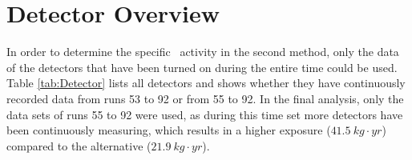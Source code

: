 \appendix


\chapter{Detector Overview}

In order to determine the specific \Kr\ activity in the second method, only the data of the detectors that have been turned on during the entire time could be used.
Table \ref{tab:Detector} lists all detectors and shows whether they have continuously recorded data from runs 53 to 92 or from 55 to 92.
In the final analysis, only the data sets of runs 55 to 92 were used, as during this time set more detectors have been continuously measuring, which results in a higher exposure ($41.5 \ \unit{kg}\cdot\unit{yr}$) compared to the alternative ($21.9 \ \unit{kg}\cdot\unit{yr}$).
